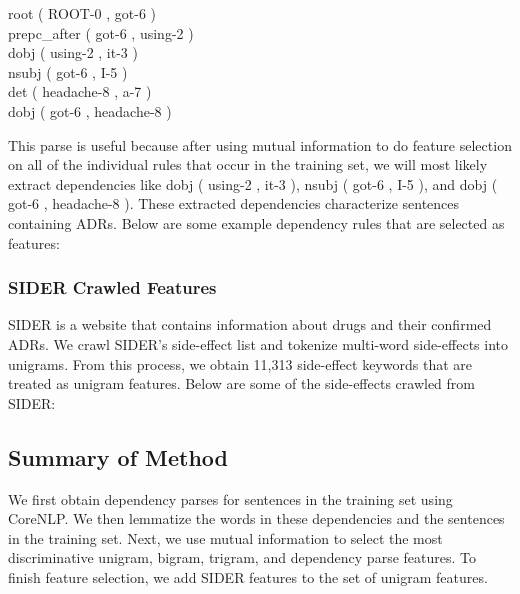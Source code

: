 \documentclass{acm_proc_article-sp}
\begin{document}
root ( ROOT-0 , got-6 ) \\
prepc\_after ( got-6 , using-2 ) \\
dobj ( using-2 , it-3 ) \\ 
nsubj ( got-6 , I-5 ) \\
det ( headache-8 , a-7 ) \\
dobj ( got-6 , headache-8 ) 

This parse is useful because after using mutual information to do feature selection on all of the individual rules that occur in the training set, we will most likely extract dependencies like dobj ( using-2 , it-3 ), nsubj ( got-6 , I-5 ), and dobj ( got-6 , headache-8 ). These extracted dependencies characterize sentences containing ADRs. Below are some example dependency rules that are selected as features:

\noindent{}

\subsubsection{SIDER Crawled Features}
SIDER is a website that contains information about drugs and their confirmed ADRs. We crawl SIDER's side-effect list and tokenize multi-word side-effects into unigrams. From this process, we obtain 11,313 side-effect keywords that are treated as unigram features. Below are some of the side-effects crawled from SIDER:

\noindent{}

\subsection{Summary of Method}
We first obtain dependency parses for sentences in the training set using CoreNLP. We then lemmatize the words in these dependencies and the sentences in the training set. Next, we use mutual information to select the most discriminative unigram, bigram, trigram, and dependency parse features. To finish feature selection, we add SIDER features to the set of unigram features. 
\end{document}
